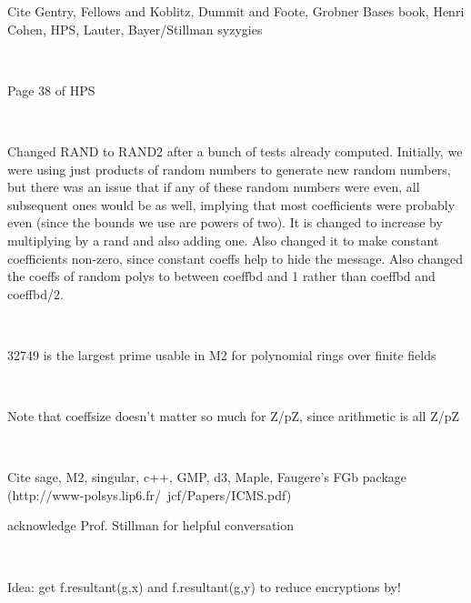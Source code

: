 \documentclass[11pt]{report}
\begin{document}
Cite Gentry, Fellows and Koblitz, Dummit and Foote, Grobner Bases book, Henri Cohen, HPS, Lauter, Bayer/Stillman syzygies

\

Page 38 of HPS

\

Changed RAND to RAND2 after a bunch of tests already computed. Initially, we were using just products of random numbers to generate new random numbers, but there was an issue that if any of these random numbers were even, all subsequent ones would be as well, implying that most coefficients were probably even (since the bounds we use are powers of two). It is changed to increase by multiplying by a rand and also adding one. Also changed it to make constant coefficients non-zero, since constant coeffs help to hide the message. Also changed the coeffs of random polys to between coeffbd and 1 rather than coeffbd and coeffbd/2.

\

32749 is the largest prime usable in M2 for polynomial rings over finite fields

\

Note that coeffsize doesn't matter so much for Z/pZ, since arithmetic is all Z/pZ

\

Cite sage, M2, singular, c++, GMP, d3, Maple, Faugere's FGb package (http://www-polsys.lip6.fr/~jcf/Papers/ICMS.pdf)

acknowledge Prof. Stillman for helpful conversation

\

Idea: get f.resultant(g,x) and f.resultant(g,y) to reduce encryptions by!
\end{document}
